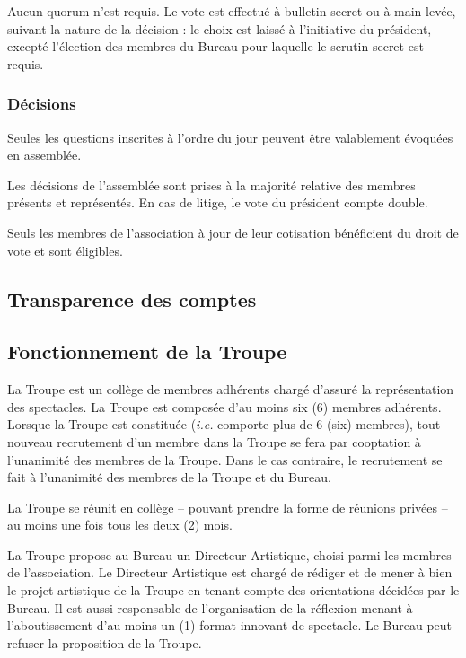 \documentclass[a4paper,french,10pt]{article}
\begin{document}
Aucun quorum n'est requis. Le vote est effectué à bulletin secret ou à
main levée, suivant la nature de la décision : le choix est laissé à
l'initiative du président, excepté l'élection des membres du Bureau
pour laquelle le scrutin secret est requis.


\subsubsection{Décisions}
\label{sec:decisions}

Seules les questions inscrites à l’ordre du jour peuvent être
valablement évoquées en assemblée.

Les décisions de l’assemblée sont prises à la majorité relative des
membres présents et représentés. En cas de litige, le vote du
président compte double.

Seuls les membres de l’association à jour de leur cotisation
bénéficient du droit de vote et sont éligibles.

\subsection{Transparence des comptes}
\label{sec:transp-des-compt}

\subsection{Fonctionnement de la Troupe}
\label{sec:fonctionnement-troupe}
La Troupe est un collège de membres adhérents chargé d'assuré la représentation des spectacles. La Troupe est composée d'au moins six (6) membres adhérents. Lorsque la Troupe est constituée (\textit{i.e.} comporte plus de 6 (six) membres), tout nouveau recrutement d'un membre dans la Troupe se fera par cooptation à l'unanimité des membres de la Troupe.
Dans le cas contraire, le recrutement se fait à l'unanimité des membres de la Troupe et du Bureau.

 La Troupe se réunit en collège -- pouvant prendre la forme de réunions privées -- au moins une fois tous les deux (2) mois.

La Troupe propose au Bureau un Directeur Artistique, choisi parmi les membres de l'association. Le Directeur Artistique est chargé de rédiger et de mener à bien le projet artistique de la Troupe en tenant compte des orientations décidées par le Bureau. Il est aussi responsable de l'organisation de la réflexion menant à l'aboutissement d'au moins un (1) format innovant de spectacle. Le Bureau peut refuser la proposition de la Troupe. 
\end{document}
